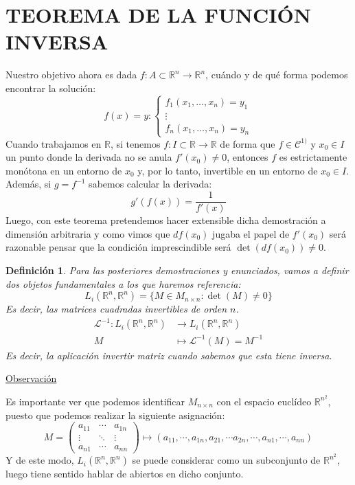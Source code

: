 \documentclass[10pt,a4paper,openright]{book}
\theoremstyle{break}
\newtheorem*{defi}{Definición}
\begin{document}
\section*{TEOREMA DE LA FUNCIÓN INVERSA}
Nuestro objetivo ahora es dada $f : A \subset \mathbb{R}^n \to \mathbb{R}^n$, cuándo y de qué forma podemos encontrar la solución:
$$ f(x) = y : \begin{cases} f_1 (x_1,…,x_n )=y_1 \\ \vdots \\ f_n (x_1,…,x_n )=y_n \end{cases}$$
Cuando trabajamos en $\mathbb{R}$, si tenemos $f : I \subset \mathbb{R} \to \mathbb{R}$ de forma que $f \in \mathcal{C}^{1)}$ y $x_0 \in I$ un punto donde la derivada no se anula $f'(x_0) \neq 0$, entonces $f$ es estrictamente monótona en un entorno de $x_0$ y, por lo tanto, invertible en un entorno de $x_0 \in I$. Además, si $g=f^{-1}$ sabemos calcular la derivada: 
$$g' (f(x)) = \frac{1}{f'(x)}$$
Luego, con este teorema pretendemos hacer extensible dicha demostración a dimensión arbitraria y como vimos que $df(x_0)$ jugaba el papel de $f'(x_0)$ será razonable pensar que la condición imprescindible será $\det (df(x_0)) \neq 0$.

\begin{defi}
Para las posteriores demostraciones y enunciados, vamos a definir dos objetos fundamentales a los que haremos referencia:
$$L_i (\mathbb{R}^n, \mathbb{R}^n) = \{M \in M_{n \times n} : \det (M) \neq 0\}$$
Es decir, las matrices cuadradas invertibles de orden $n$.
\begin{align*}
\mathcal{L}^{-1} : L_i (\mathbb{R}^n, \mathbb{R}^n) &\to L_i (\mathbb{R}^n, \mathbb{R}^n) \\ M &\mapsto \mathcal{L}^{-1} (M) = M^{-1}
\end{align*}
Es decir, la aplicación invertir matriz cuando sabemos que esta tiene inversa.
\end{defi}

\underline{Observación}

Es importante ver que podemos identificar $M_{n \times n}$ con el espacio euclídeo $\mathbb{R}^{n^2}$, puesto que podemos realizar la siguiente asignación:
$$M = \begin{pmatrix}
a_{11} & \cdots & a_{1n} \\ \vdots & \ddots & \vdots \\ a_{n1} & \cdots & a_{nn}
\end{pmatrix} \longmapsto (a_{11}, \cdots, a_{1n} ,a_{21}, \cdots a_{2n}, \cdots, a_{n1}, \cdots, a_{nn})$$
Y de este modo, $L_i (\mathbb{R}^n, \mathbb{R}^n)$ se puede considerar como un subconjunto de $\mathbb{R}^{n^2}$, luego tiene sentido hablar de abiertos en dicho conjunto.
\end{document}
